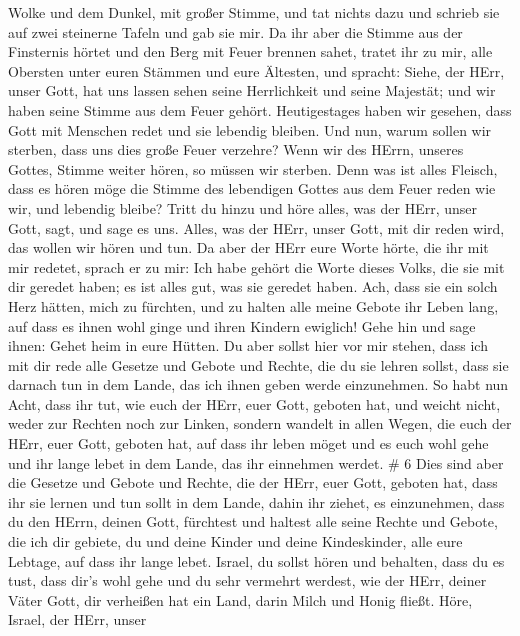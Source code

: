 Wolke und dem Dunkel, mit großer Stimme, und tat nichts dazu und schrieb
sie auf zwei steinerne Tafeln und gab sie mir.  Da ihr aber
die Stimme aus der Finsternis hörtet und den Berg mit Feuer brennen
sahet, tratet ihr zu mir, alle Obersten unter euren Stämmen und eure
Ältesten,  und spracht: Siehe, der HErr, unser Gott, hat
uns lassen sehen seine Herrlichkeit und seine Majestät; und wir haben
seine Stimme aus dem Feuer gehört. Heutigestages haben wir gesehen, dass
Gott mit Menschen redet und sie lebendig bleiben.  Und nun,
warum sollen wir sterben, dass uns dies große Feuer verzehre? Wenn wir
des HErrn, unseres Gottes, Stimme weiter hören, so müssen wir sterben.
 Denn was ist alles Fleisch, dass es hören möge die Stimme
des lebendigen Gottes aus dem Feuer reden wie wir, und lebendig bleibe?
 Tritt du hinzu und höre alles, was der HErr, unser Gott,
sagt, und sage es uns. Alles, was der HErr, unser Gott, mit dir reden
wird, das wollen wir hören und tun.  Da aber der HErr eure
Worte hörte, die ihr mit mir redetet, sprach er zu mir: Ich habe gehört
die Worte dieses Volks, die sie mit dir geredet haben; es ist alles gut,
was sie geredet haben.  Ach, dass sie ein solch Herz
hätten, mich zu fürchten, und zu halten alle meine Gebote ihr Leben
lang, auf dass es ihnen wohl ginge und ihren Kindern ewiglich!
 Gehe hin und sage ihnen: Gehet heim in eure Hütten.
 Du aber sollst hier vor mir stehen, dass ich mit dir rede
alle Gesetze und Gebote und Rechte, die du sie lehren sollst, dass sie
darnach tun in dem Lande, das ich ihnen geben werde einzunehmen.
 So habt nun Acht, dass ihr tut, wie euch der HErr, euer
Gott, geboten hat, und weicht nicht, weder zur Rechten noch zur Linken,
 sondern wandelt in allen Wegen, die euch der HErr, euer
Gott, geboten hat, auf dass ihr leben möget und es euch wohl gehe und
ihr lange lebet in dem Lande, das ihr einnehmen werdet. \# 6
 Dies sind aber die Gesetze und Gebote und Rechte, die der
HErr, euer Gott, geboten hat, dass ihr sie lernen und tun sollt in dem
Lande, dahin ihr ziehet, es einzunehmen,  dass du den HErrn,
deinen Gott, fürchtest und haltest alle seine Rechte und Gebote, die ich
dir gebiete, du und deine Kinder und deine Kindeskinder, alle eure
Lebtage, auf dass ihr lange lebet.  Israel, du sollst hören
und behalten, dass du es tust, dass dir's wohl gehe und du sehr vermehrt
werdest, wie der HErr, deiner Väter Gott, dir verheißen hat ein Land,
darin Milch und Honig fließt.  Höre, Israel, der HErr, unser
